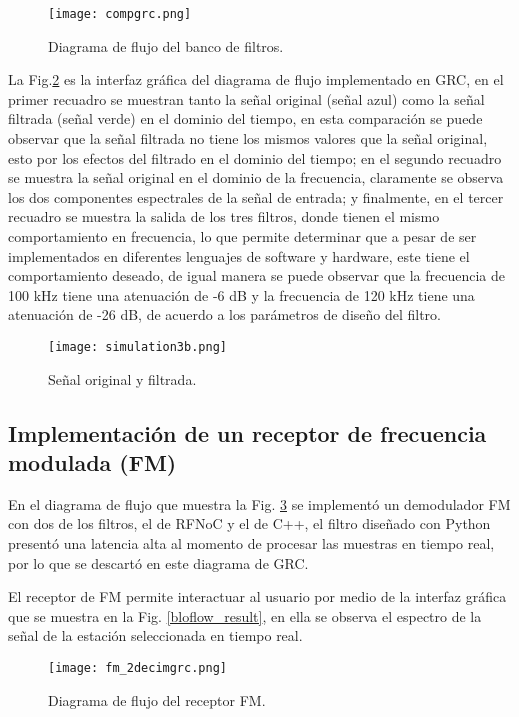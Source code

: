 \documentclass[12pt]{difu100cia} %
\begin{document}
\begin{figure}[!htb]
	\centering
	\texttt{[image: compgrc.png]}
	\caption{Diagrama de flujo del banco de filtros.}
	\label{bloque_py_flow}
\end{figure}

La Fig.\ref{bloque_simulacion_3} es la interfaz gráfica del diagrama de flujo implementado en GRC, en el primer recuadro se muestran tanto la señal original (señal azul) como la señal filtrada (señal verde) en el dominio del tiempo, en esta comparación se puede observar que la señal filtrada no tiene los mismos valores que la señal original, esto por los efectos del filtrado en el dominio del tiempo; en el segundo recuadro se muestra la señal original en el dominio de la frecuencia, claramente se observa los dos componentes espectrales de la señal de entrada; y finalmente, en el tercer recuadro se muestra la salida de los tres filtros, donde tienen el mismo comportamiento en frecuencia, lo que permite determinar que a pesar de ser implementados en diferentes lenguajes de software y hardware, este tiene el comportamiento deseado, de igual manera se puede observar que la frecuencia de 100 kHz tiene una atenuación de -6 dB y la frecuencia de 120 kHz tiene una atenuación de -26 dB, de acuerdo a los parámetros de diseño del filtro.

\begin{figure}[!ht]
	\centering
	\texttt{[image: simulation3b.png]}
	\caption{Señal original y filtrada.}
	\label{bloque_simulacion_3}
\end{figure}

\subsection{Implementación de un receptor de frecuencia modulada (FM)}

En el diagrama de flujo que muestra la Fig. \ref{diagramaflujo2filtrosfm} se implementó un demodulador FM con dos de los filtros, el de RFNoC y el de C++, el filtro diseñado con Python presentó una latencia alta al momento de procesar las muestras en tiempo real, por lo que se descartó en este diagrama de GRC.

El receptor de FM permite interactuar al usuario por medio de la interfaz gráfica que se muestra en la Fig. \ref{bloflow_result}, en ella se observa el espectro de la señal de la estación seleccionada en tiempo real. 

\begin{figure}[!ht]
	\centering
	\texttt{[image: fm\_2decimgrc.png]}
	\caption{Diagrama de flujo del receptor FM.}
	\label{diagramaflujo2filtrosfm}
\end{figure}
\end{document}
